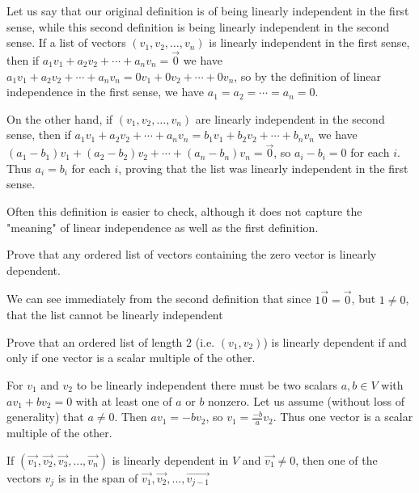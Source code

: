 \documentclass{ximera}
\begin{document}
 
 \begin{free-response}
	Let us say that our original definition is of  being linearly independent in the first sense, while this second definition is being linearly independent 
	in the second sense.  If a list of vectors $(v_1,v_2,\ldots,v_n)$ is linearly independent in the first sense, then if $a_1v_1+a_2v_2 + \cdots +a_nv_n = \vec{0}$ we have
	$a_1v_1+a_2v_2 + \cdots +a_nv_n = 0v_1+0v_2+ \cdots +0v_n$, so by the definition of linear independence in the first sense, we have $a_1=a_2= \cdots =a_n=0$.
	
	On the other hand, if $(v_1,v_2,\ldots,v_n)$ are linearly independent in the second sense, then if $a_1v_1+a_2v_2 + \cdots +a_nv_n = b_1v_1 + b_2v_2 + \cdots + b_nv_n$ we have
	$(a_1-b_1)v_1+(a_2-b_2)v_2+\cdots+(a_n-b_n)v_n = \vec{0}$, so $a_i-b_i=0$ for each $i$.  Thus $a_i=b_i$ for each $i$, proving that the list was linearly independent 
	in the first sense.
 \end{free-response}
 
  	Often this definition is easier to check, although it does not capture the "meaning" of linear independence as well as the first definition.

 
 	Prove that any ordered list of vectors containing the zero vector is linearly dependent. 
	\begin{free-response}
		We can see immediately from the second definition that since $1\vec{0} = \vec{0}$, but $1\neq 0$, that the list cannot be linearly independent
	\end{free-response}
 
 	Prove that an ordered list of length $2$ (i.e. $(v_1,v_2)$) is linearly dependent if and only if one vector is a scalar multiple of the other.
	\begin{free-response}
		For $v_1$ and $v_2$ to be linearly independent there must be two scalars $a,b \in V$ with $av_1+bv_2=0$ with at least one of $a$ or $b$ nonzero.
		Let us assume (without loss of generality) that $a \neq 0$.  Then $av_1=-bv_2$, so $v_1=\frac{-b}{a}v_2$.  Thus one vector is a scalar multiple of the other.	
	
		\end{free-response}


 \begin{theorem}
 	If $(\vec{v_1},\vec{v_2},\vec{v_3}, \ldots, \vec{v_n})$ is linearly dependent in $V$ and $\vec{v_1} \neq 0$, then one of the vectors $v_j$ is in the 
 	span of $\vec{v_1},\vec{v_2},\ldots,\vec{v_{j-1}}$
 \end{theorem}
 
\end{document}
